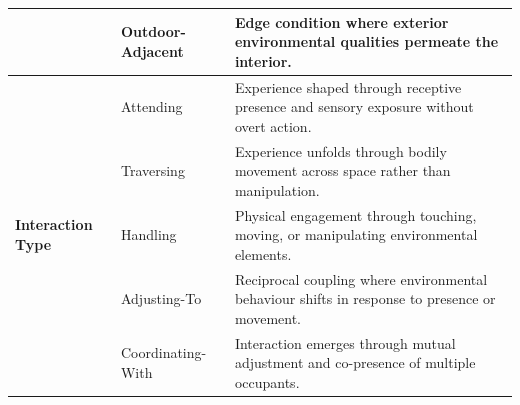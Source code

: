 \begin{table}[!ht]
\begin{tabular}{@{}
  p{}
  p{}
  p{}
@{}}
& Outdoor-Adjacent & Edge condition where exterior environmental qualities permeate the interior. \\
\midrule
\multirow{5}{=}{\centering\textbf{Interaction Type}} & Attending & Experience shaped through receptive presence and sensory exposure without overt action. \\
& Traversing & Experience unfolds through bodily movement across space rather than manipulation. \\
& Handling & Physical engagement through touching, moving, or manipulating environmental elements. \\
& Adjusting-To & Reciprocal coupling where environmental behaviour shifts in response to presence or movement. \\
& Coordinating-With & Interaction emerges through mutual adjustment and co-presence of multiple occupants. \\
\bottomrule
\end{tabular}
\end{table}


